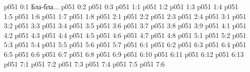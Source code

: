 \author{Вторичный Ланонандек}
\vs p051 0:1  Бла-бла...
\vs p051 0:2 
\vs p051 0:3 
\vs p051 1:1 
\vs p051 1:2 
\vs p051 1:3 \pc 
\vs p051 1:4 
\vs p051 1:5 
\vs p051 1:6 \pc 
\vs p051 1:7 
\vs p051 1:8 \pc 
{}
\vs p051 2:1 
\vs p051 2:2 
\vs p051 2:3 \pc 
\vs p051 2:4 \pc 
{}
\vs p051 3:1 
\vs p051 3:2 
\vs p051 3:3 \pc 
\vs p051 3:4 
\vs p051 3:5 \pc 
\vs p051 3:6 \pc 
\vs p051 3:7 
\vs p051 3:8 
\vs p051 3:9 \pc 
{}
\vs p051 4:1 
\vs p051 4:2 
\vs p051 4:3 
\vs p051 4:4 
\vs p051 4:5 \pc 
\vs p051 4:6 
\vs p051 4:7 
\vs p051 4:8 
\vs p051 5:1 
\vs p051 5:2 
\vs p051 5:3 
\vs p051 5:4 
\vs p051 5:5 \pc 
\vs p051 5:6 
\vs p051 5:7 
\vs p051 6:1 
\vs p051 6:2 
\vs p051 6:3 
\vs p051 6:4 
\vs p051 6:5 \pc 
\vs p051 6:6 
\vs p051 6:7 
\vs p051 6:8 
\vs p051 6:9 
\vs p051 6:10 
\vs p051 6:11 
\vs p051 6:12 
\vs p051 6:13 
\vs p051 7:1 
\vs p051 7:2 
\vs p051 7:3 
\vs p051 7:4 
\vs p051 7:5 
\vsetoff
\vs p051 7:6 
\quizlink
